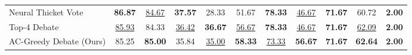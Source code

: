 \begin{table}[t]
{\begin{tabular}{l ccc ccccc cc}
    Neural Thicket Vote
        & \textbf{86.87}
        & \underline{84.67}
        & \textbf{37.57}
        & 28.33
        & 51.67
        & \textbf{78.33}
        & \underline{46.67}
        & \textbf{71.67}
        & 60.72
        & \textbf{2.00} \\
    Top-4 Debate
        & \underline{85.93}
        & 84.33
        & \underline{36.42}
        & \textbf{36.67}
        & \underline{56.67}
        & \textbf{78.33}
        & \underline{46.67}
        & \textbf{71.67}
        & \underline{62.09}
        & \textbf{2.00} \\
    \rowcolor{black!6}
    AC-Greedy Debate (Ours)
        & 85.25
        & \textbf{85.00}
        & 35.84
        & \underline{35.00}
        & \textbf{58.33}
        & \underline{73.33}
        & \textbf{56.67}
        & \textbf{71.67}
        & \textbf{62.64}
        & \textbf{2.00} \\
    \bottomrule
    \end{tabular}
    }
    \vskip -0.2cm
\end{table}
